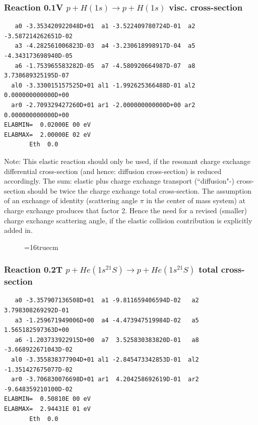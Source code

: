 \documentclass[12pt,dvipdfmx]{article}
\begin{document}
\subsubsection{
Reaction 0.1V    $p + H(1s) \rightarrow p + H(1s)$ visc. cross-section
}



\begin{small}\begin{verbatim}
   a0 -3.353420922048D+01  a1 -3.522409780724D-01  a2 -3.587214262651D-02
   a3 -4.282561006823D-03  a4 -3.230618998917D-04  a5 -4.343173698940D-05
   a6 -1.753965583282D-05  a7 -4.580920664987D-07  a8  3.738689325195D-07
  al0 -3.330015157525D+01 al1 -1.992625366488D-01 al2  0.000000000000D+00
  ar0 -2.709329427260D+01 ar1 -2.000000000000D+00 ar2  0.000000000000D+00
ELABMIN=  0.02000E 00 eV
ELABMAX=  2.00000E 02 eV
       Eth  0.0
\end{verbatim}\end{small}

Note: This elastic reaction should only be used, if the resonant charge
exchange differential cross-section (and hence: diffusion cross-section)
is reduced accordingly. The sum: elastic plus charge exchange transport
(``diffusion"-) cross-section should be twice the charge exchange total
cross-section. The assumption of an exchange of identity (scattering
angle $\pi$ in the center of mass system) at charge exchange produces
that factor 2. Hence the need for a revised (smaller) charge exchange
scattering angle, if the elastic collision contribution is explicitly
added in.

\begin{figure} \label{0.1}
\epsfxsize=16truecm
\end{figure}
\newpage

\subsubsection{
Reaction 0.2T   $ p + He(1s^21S) \rightarrow p + He (1s^21S)$ total cross-section
}



\begin{small}\begin{verbatim}
   a0 -3.357907136508D+01  a1 -9.811659406594D-02   a2  3.798308269292D-01
   a3 -1.259671949006D+00  a4 -4.473947519984D-02   a5  1.565182597363D+00
   a6 -1.203733922915D+00  a7  3.525830383820D-01   a8 -3.668922671043D-02
  al0 -3.355838377904D+01 al1 -2.845473342853D-01  al2 -1.351427675077D-02
  ar0 -3.706830076698D+01 ar1  4.204258692619D-01  ar2 -9.648359210100D-02
ELABMIN=  0.50810E 00 eV
ELABMAX=  2.94431E 01 eV
       Eth  0.0
\end{verbatim}\end{small}
\end{document}
